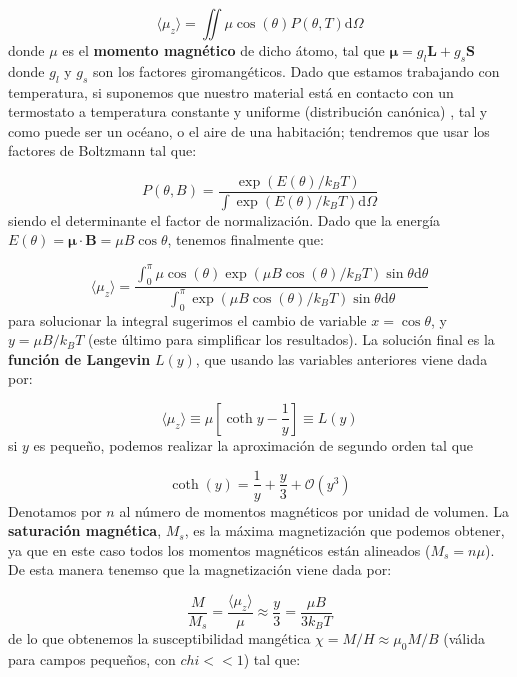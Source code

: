 \documentclass[12pt,a4paper]{book}
\numberwithin{equation}{section}
\numberwithin{figure}{section}
\newcommand{\parentesis}[1]{\left( #1  \right)}
\newcommand{\ccorchetes}[1]{\left[ #1  \right]}
\newcommand{\D}{\mathrm{d}}
\newcommand{\Bn}{\mathbf{B}}
\newcommand{\Ln}{\mathbf{L}}
\newcommand{\Sn}{\mathbf{S}}
\newcommand{\mun}{\boldsymbol{\mu}}
\begin{document}
$$  \langle \mu_z \rangle = \iint \mu \cos (\theta) P (\theta,T)  \D \Omega $$
donde $\mu$ es el \textbf{momento magnético} de dicho átomo, tal que $\mun = g_l \Ln + g_s \Sn $ donde $g_l$ y $g_s$ son los factores giromangéticos. Dado que estamos trabajando con temperatura, si suponemos que nuestro material está en contacto con un termostato a temperatura constante y uniforme (distribución canónica) , tal y como puede ser un océano, o el aire de una habitación; tendremos que usar los factores de Boltzmann tal que:

\begin{equation}
P (\theta,B) = \frac{\exp \parentesis{E(\theta)/k_B T}}{\int \exp\parentesis{E(\theta)/k_B T} \D \Omega}
\end{equation} 
siendo el determinante el factor de normalización. Dado que la energía $E(\theta) = \mun \cdot \Bn = \mu B \cos \theta$, tenemos finalmente que:

\begin{equation}
\langle \mu_z \rangle = \frac{\int_0^\pi \mu \cos (\theta) \exp \parentesis{\mu B \cos (\theta) / k_B T} \sin \theta \D \theta}{\int_0^\pi \exp \parentesis{\mu B \cos (\theta) / k_B T} \sin \theta \D \theta}
\end{equation}
para solucionar la integral sugerimos el cambio de variable $x=\cos \theta$, y $y=\mu B / k_B T$ (este último para simplificar los resultados). La solución final es la \textbf{función de Langevin} $L(y)$, que usando las variables anteriores viene dada por:

\begin{equation}
\langle \mu_z \rangle \equiv \mu \ccorchetes{\coth y - \frac{1}{y}} \equiv L(y)
\end{equation}
si $y$ es pequeño, podemos realizar la aproximación de segundo orden tal que

$$\coth (y) = \frac{1}{y} + \frac{y}{3} + \mathcal{O} (y^3)$$
Denotamos por $n$ al número de momentos magnéticos por unidad de volumen. La \textbf{saturación magnética}, $M_s$, es la máxima magnetización que podemos obtener, ya que en este caso todos los momentos magnéticos están alineados ($M_s = n \mu$). De esta manera tenemso que la magnetización viene dada por:

\begin{equation}
\frac{M}{M_s} = \frac{\langle \mu_z \rangle}{\mu} \approx \frac{y}{3} = \frac{\mu B}{3 k_B T}
\end{equation}
de lo que obtenemos la susceptibilidad mangética $\chi = M/H \approx \mu_0 M / B$ (válida para campos pequeños, con $chi << 1$) tal que:
\end{document}
